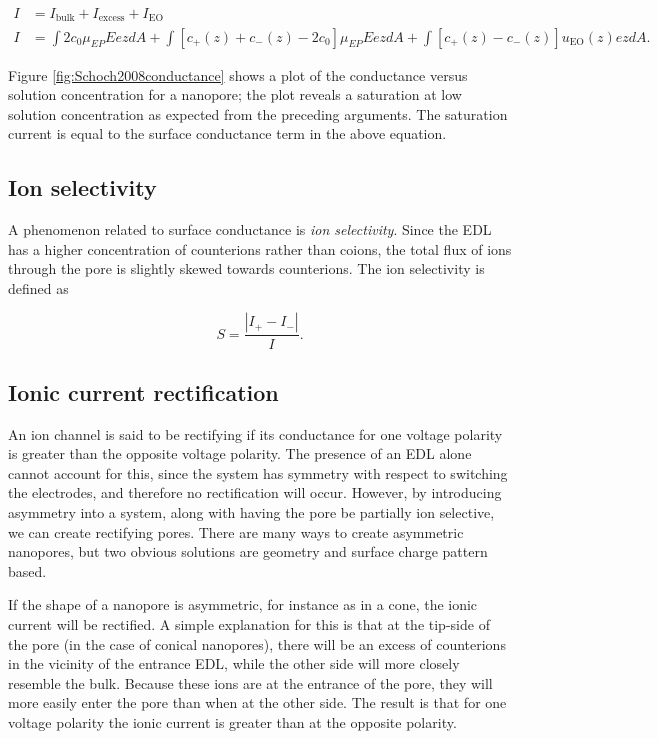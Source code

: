 			
			\begin{equation} \label{eq:totalconductance}
				\begin{split}
					I &= I_{\mathrm{bulk}}+I_{\mathrm{excess}}+I_{\mathrm{EO}} \\
					I &= \int 2c_{0}\mu_{EP}EezdA + \int\left[c_{+}\left(z\right)+c_{-}\left(z\right)-2c_{0}\right]\mu_{EP}EezdA + \int\left[c_{+}\left(z\right)-c_{-}\left(z\right)\right]u_{\mathrm{EO}}\left(z\right)ezdA.
				\end{split}
			\end{equation}
			
			Figure \ref{fig:Schoch2008conductance} shows a plot of the conductance versus solution concentration for a nanopore; the plot reveals a saturation at low solution concentration as expected from the preceding arguments. The saturation current is equal to the surface conductance term in the above equation.
			
		\subsection{Ion selectivity}
			A phenomenon related to surface conductance is \textit{ion selectivity}. Since the EDL has a higher concentration of counterions rather than coions, the total flux of ions through the pore is slightly skewed towards counterions. The ion selectivity is defined as
			
			\begin{equation} \label{eq:selectivity}
				S=\frac{|I_{+}-I_{-}|}{I}.				
			\end{equation}
			
		
		\subsection{Ionic current rectification}
			An ion channel is said to be rectifying if its conductance for one voltage polarity is greater than the opposite voltage polarity. The presence of an EDL alone cannot account for this, since the system has symmetry with respect to switching the electrodes, and therefore no rectification will occur. However, by introducing asymmetry into a system, along with having the pore be partially ion selective, we can create rectifying pores. There are many ways to create asymmetric nanopores, but two obvious solutions are geometry and surface charge pattern based.
			
			If the shape of a nanopore is asymmetric, for instance as in a cone, the ionic current will be rectified. A simple explanation for this is that at the tip-side of the pore (in the case of conical nanopores), there will be an excess of counterions in the vicinity of the entrance EDL, while the other side will more closely resemble the bulk. Because these ions are at the entrance of the pore, they will more easily enter the pore than when at the other side. The result is that for one voltage polarity the ionic current is greater than at the opposite polarity.
			
